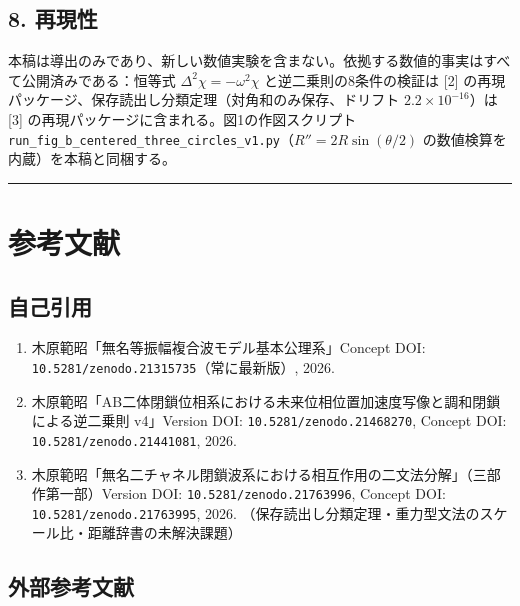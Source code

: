 \documentclass[
  a4paper,
]{ltjsarticle}
\providecommand{\tightlist}{%
  \setlength{\itemsep}{0pt}\setlength{\parskip}{0pt}}
\begin{document}
\subsection{8. 再現性}\label{ux518dux73feux6027}

本稿は導出のみであり、新しい数値実験を含まない。依拠する数値的事実はすべて公開済みである：恒等式
\(\Delta^2\chi=-\omega^2\chi\) と逆二乗則の8条件の検証は {[}2{]}
の再現パッケージ、保存読出し分類定理（対角和のみ保存、ドリフト
\(2.2\times10^{-16}\)）は {[}3{]}
の再現パッケージに含まれる。図1の作図スクリプト
\texttt{run\_fig\_b\_centered\_three\_circles\_v1.py}（\(R''=2R\sin(\theta/2)\)
の数値検算を内蔵）を本稿と同梱する。

\begin{center}\rule{0.5\linewidth}{0.5pt}\end{center}

\section{参考文献}\label{ux53c2ux8003ux6587ux732e}

\subsection{自己引用}\label{ux81eaux5df1ux5f15ux7528}

\begin{enumerate}
\def\labelenumi{\arabic{enumi}.}
\tightlist
\item
  木原範昭「無名等振幅複合波モデル基本公理系」Concept DOI:
  \texttt{10.5281/zenodo.21315735}（常に最新版）, 2026.
\item
  木原範昭「AB二体閉鎖位相系における未来位相位置加速度写像と調和閉鎖による逆二乗則
  v4」Version DOI: \texttt{10.5281/zenodo.21468270}, Concept DOI:
  \texttt{10.5281/zenodo.21441081}, 2026.
\item
  木原範昭「無名二チャネル閉鎖波系における相互作用の二文法分解」（三部作第一部）Version
  DOI: \texttt{10.5281/zenodo.21763996}, Concept DOI:
  \texttt{10.5281/zenodo.21763995}, 2026.
  （保存読出し分類定理・重力型文法のスケール比・距離辞書の未解決課題）
\end{enumerate}

\subsection{外部参考文献}\label{ux5916ux90e8ux53c2ux8003ux6587ux732e}
\end{document}
